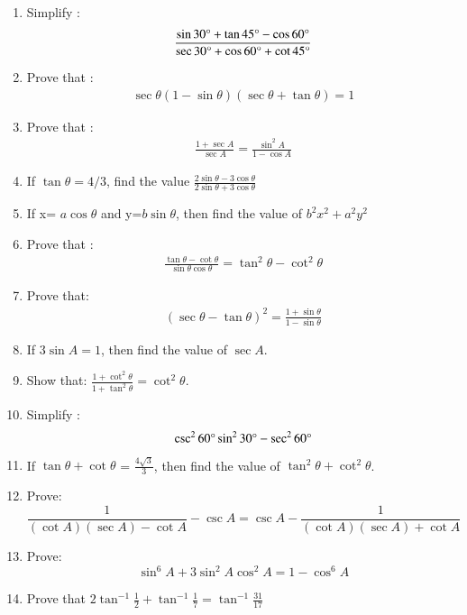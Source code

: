 \begin{enumerate}[label=\thesubsection.\arabic*.,ref=\thesubsection.\theenumi]
    \hfill{}
\item  Simplify :
\begin{align}
\frac{\sin 30\degree + \tan 45\degree-\cos 60\degree}{\sec 30\degree + \cos 60\degree + \cot 45\degree} 
\end{align}


\hfill{}\item Prove that :
\begin{align}
 \sec \theta (1-\sin\theta)(\sec\theta+ \tan\theta)=1
\end{align}

\hfill{}\item Prove that :
\begin{align}
\frac{1+\sec A}{\sec A}=\frac{\sin^2 A}{1-\cos A} 
\end{align}

\hfill{}\item If  $\tan \theta = 4/3$, find the value 
$\frac{2\sin \theta -3\cos \theta}{2\sin\theta+3\cos\theta}$

\hfill{}\item If x=  $a\cos\theta$ and y=$b\sin\theta$, then find the value of   $b^2x^2+a^2y^2$

\hfill{}\item Prove that :
\begin{align}
\frac{\tan\theta-\cot\theta}{\sin\theta\cos\theta}=\tan^2\theta-\cot^2\theta 
\end{align}
\hfill{}\item Prove that:
\begin{align}
(\sec\theta-\tan\theta)^2 =\frac{1+\sin\theta}{1-\sin\theta}
\end{align}

		\hfill{}\item If $3\sin A = 1$, then find the value of $\sec A$.
		\hfill{}\item Show that: $\frac{1 + \cot^2{\theta}}{1 + \tan^2{\theta}} = \cot^2{\theta}$.
\hfill{}\item Simplify :$${\csc^{2}{60\degree} \sin^{2}{30\degree} - \sec^{2}{60\degree}}$$
	\hfill{}\item If $\tan{\theta} + \cot{\theta}$ = $\frac{4 \sqrt{3}}{3}$, then find the value of $\tan^{2}{\theta} + \cot^{2}{\theta}$. 
		\hfill{}\item Prove:$$\frac{1}{(\cot A)(\sec A) - \cot A} - \csc A = \csc A - \frac{1}{(\cot A)(\sec A) + \cot A}$$
		\hfill{}\item Prove:$$\sin^{6} A + 3\sin^{2} A \cos^{2} A = 1 - \cos^{6}  A$$
		\hfill{}
\item Prove that $2\tan^{-1}\frac{1}{2} + \tan^{-1}\frac{1}{7} = \tan^{-1}\frac{31}{17}$


\end{enumerate}
